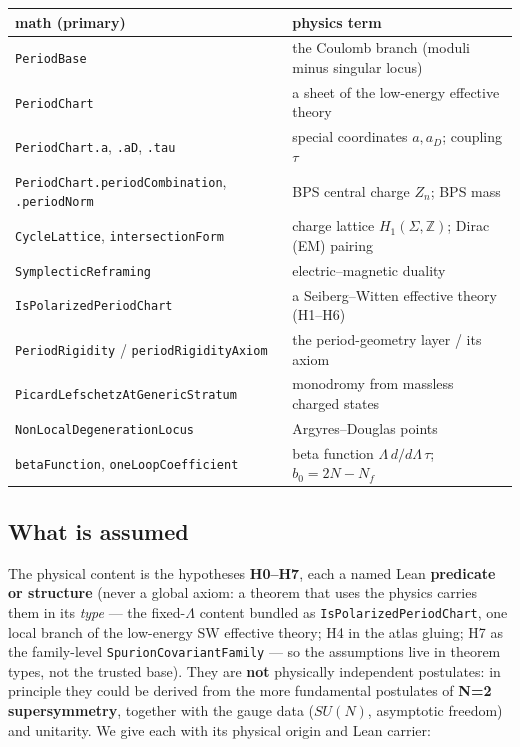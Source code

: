 \documentclass{article}
\theoremstyle{plain}
\theoremstyle{definition}
\numberwithin{equation}{section}
\newcommand{\code}[1]{\texttt{#1}}
\begin{document}
\begin{center}\small
\begin{tabular}{ll}
\hline
math (primary) & physics term\\
\hline
\code{PeriodBase} & the Coulomb branch (moduli minus singular locus)\\
\code{PeriodChart} & a sheet of the low-energy effective theory\\
\code{PeriodChart.a}, \code{.aD}, \code{.tau} & special coordinates $a, a_D$; coupling $\tau$\\
\code{PeriodChart.periodCombination}, \code{.periodNorm} & BPS central charge $Z_n$; BPS mass\\
\code{CycleLattice}, \code{intersectionForm} & charge lattice $H_1(\Sigma,\mathbb{Z})$; Dirac (EM) pairing\\
\code{SymplecticReframing} & electric--magnetic duality\\
\code{IsPolarizedPeriodChart} & a Seiberg--Witten effective theory (H1--H6)\\
\code{PeriodRigidity} / \code{periodRigidityAxiom} & the period-geometry layer / its axiom\\
\code{PicardLefschetzAtGenericStratum} & monodromy from massless charged states\\
\code{NonLocalDegenerationLocus} & Argyres--Douglas points\\
\code{betaFunction}, \code{oneLoopCoefficient} & beta function $\Lambda\,d/d\Lambda\,\tau$; $b_0=2N-N_f$\\
\hline
\end{tabular}
\end{center}

\subsection{What is assumed}

The physical content is the hypotheses \textbf{H0--H7}, each a named Lean \textbf{predicate or
structure} (never a global axiom: a theorem that uses the physics carries them in its
\emph{type} --- the fixed-$\Lambda$ content bundled as \code{IsPolarizedPeriodChart}, one
local branch of the low-energy SW effective theory; H4 in the atlas gluing; H7 as the
family-level \code{SpurionCovariantFamily} --- so the assumptions live in theorem types, not
the trusted base). They are \textbf{not} physically independent postulates: in principle they could be derived from the more fundamental postulates of
\textbf{N=2 supersymmetry}, together with the gauge data
($SU(N)$, asymptotic freedom) and unitarity. We give each with its physical origin and Lean carrier:
\end{document}
